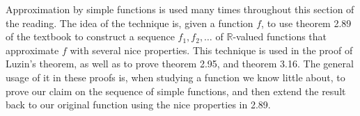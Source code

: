 \documentclass[12pt]{article}
\def\R{\mathbb{R}}
\begin{document}
Approximation by simple functions is used many times throughout this section of the reading. The idea of the technique is, given a function $f$, to use theorem 2.89 of the textbook to construct a sequence $f_1, f_2, \ldots$ of $\R$-valued functions that approximate $f$ with several nice properties. This technique is used in the proof of Luzin's theorem, as well as to prove theorem 2.95, and theorem 3.16. The general usage of it in these proofs is, when studying a function we know little about, to prove our claim on the sequence of simple functions, and then extend the result back to our original function using the nice properties in 2.89.
\maketitle
\end{document}
